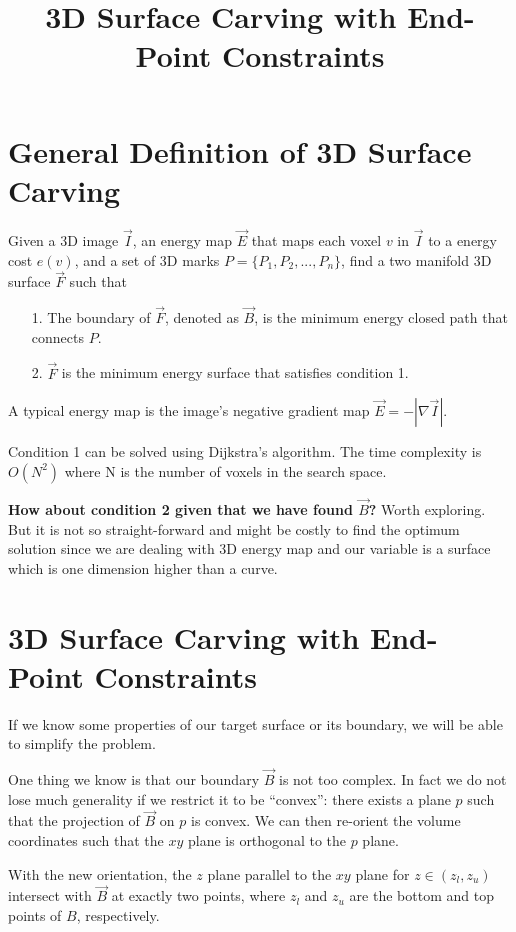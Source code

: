 \documentclass[12pt,a4paper,hidelinks]{article}            %
\title{\vspace{-3ex}3D Surface Carving with End-Point Constraints\vspace{-4ex}}
\date{}
\begin{document}
\maketitle
\section{General Definition of 3D Surface Carving}
Given a 3D image $\vec{I}$,
an energy map $\vec{E}$ that maps each voxel $v$ in $\vec{I}$ to a energy cost $e(v)$, and
a set of 3D marks $P = \{P_1, P_2, ..., P_n\}$, 
find a two manifold 3D surface $\vec{F}$ such that
\begin{itemize}[noitemsep,nolistsep]
\item[1.] The boundary of $\vec{F}$, denoted as $\vec{B}$, is the minimum energy closed path that connects $P$. 
\item[2.] $\vec{F}$ is the minimum energy surface that satisfies condition 1. 
\end{itemize}
A typical energy map is the image's negative gradient map $\vec{E} = -|\nabla\vec{I}|$. 

Condition 1 can be solved using Dijkstra's algorithm.
The time complexity is $O(N^2)$ where N is the number of voxels in the search space. 

\textbf{How about condition 2 given that we have found $\vec{B}$?}
Worth exploring. But it is not so straight-forward and might be costly to find the optimum solution 
since we are dealing with 3D energy map and our variable is a surface which is one dimension higher than a curve.

\section{3D Surface Carving with End-Point Constraints}

If we know some properties of our target surface or its boundary, we will be able to simplify the problem.

One thing we know is that our boundary $\vec{B}$ is not too complex. 
In fact we do not lose much generality if we restrict it to be ``convex'': there exists a plane $p$ such that the projection of $\vec{B}$ on $p$ is convex.
We can then re-orient the volume coordinates such that the $xy$ plane is orthogonal to the $p$ plane. 

With the new orientation, the $z$ plane parallel to the $xy$ plane for $z \in (z_l, z_u)$ intersect with $\vec{B}$ at exactly two points, 
where $z_l$ and $z_u$ are the bottom and top points of $B$, respectively.
\end{document}
